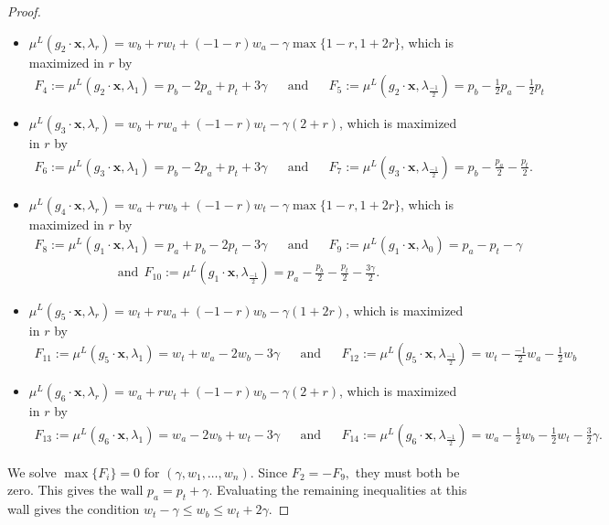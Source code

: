 \documentclass[10pt,a4paper]{amsart}
\begin{document}
\begin{proof}
\begin{itemize}
    
    \item $\mu^L(g_2 \cdot \mathbf{x}, \lambda_r) = w_b + rw_t +(-1-r) w_a - \gamma \max\{1-r, 1+2r \}$, which is maximized in $r$ by
      \begin{align*}
        F_4 := \mu^L(g_2 \cdot \mathbf{x},  \lambda_1) = p_b -2 p_a + p_t + 3 \gamma 
        && \text{and} &&
        F_5 := \mu^L(g_2 \cdot \mathbf{x}, \lambda_{\frac{-1}{2}}) = p_b - \frac{1}{2}p_a - \frac{1}{2}p_t
    \end{align*}
    
    \item $\mu^L(g_3 \cdot \mathbf{x}, \lambda_r) = w_b + rw_a + (-1-r)w_t - \gamma (2+r)$, which is maximized in $r$ by
     \begin{align*}
        F_6 := \mu^L(g_3 \cdot \mathbf{x}, \lambda_1) = p_b -2 p_a + p_t + 3 \gamma
        && \text{and} &&
        F_7 := \mu^L(g_3 \cdot \mathbf{x}, \lambda_{\frac{-1}{2}}) = p_b - \frac{p_a}{2} - \frac{p_t}{2}.
    \end{align*}
    
    \item $\mu^L(g_4 \cdot \mathbf{x}, \lambda_r) = w_a + r w_b + (-1-r) w_t - \gamma \max \{1-r, 1+2r\}$, which is maximized in $r$ by
    \begin{align*}
        F_8 := \mu^L(g_1 \cdot \mathbf{x}, \lambda_1) = p_a + p_b - 2 p_t - 3 \gamma
        && \text{and} &&
        F_9 := \mu^L(g_1 \cdot \mathbf{x},  \lambda_0) = p_a - p_t - \gamma
        \end{align*}
        \begin{align*} \text{and} \ \
        F_{10} := \mu^L(g_1 \cdot \mathbf{x}, \lambda_{\frac{-1}{2}}) = p_a - \frac{p_b}{2} - \frac{p_t}{2} - \frac{3\gamma}{2}.
    \end{align*}
    
    
    \item $\mu^L(g_5 \cdot \mathbf{x}, \lambda_r) = w_t + rw_a + (-1-r)w_b - \gamma(1+2r)$, which is maximized in $r$ by
    \begin{align*}
        F_{11} := \mu^L(g_5 \cdot \mathbf{x}, \lambda_1) = w_t + w_a - 2w_b -3\gamma
        && \text{and} &&
        F_{12} := \mu^L(g_5 \cdot \mathbf{x}, \lambda_{\frac{-1}{2}}) = w_t - \frac{-1}{2}w_a - \frac{1}{2}w_b
    \end{align*}
    
    \item $\mu^L(g_6 \cdot \mathbf{x}, \lambda_r) = w_a + rw_t + (-1-r)w_b - \gamma(2+r)$, which is maximized in $r$ by
    \begin{align*}
        F_{13} := \mu^L(g_6 \cdot \mathbf{x}, \lambda_1) = w_a -2w_b + w_t - 3\gamma
        && \text{and} &&
        F_{14} := \mu^L(g_6 \cdot \mathbf{x}, \lambda_{\frac{-1}{2}}) = w_a - \frac{1}{2}w_b - \frac{1}{2}w_t - \frac{3}{2}\gamma.
    \end{align*}
\end{itemize}
We solve $\max \{F_i\} =0$ for $(\gamma, w_1, \dots , w_n)$. Since $F_2 = -F_9,$ they must both be zero. This gives the wall $p_a = p_t + \gamma.$ Evaluating the remaining inequalities at this wall gives the condition $w_t - \gamma \leq w_b \leq w_t +2 \gamma.$





\end{proof}
\end{document}
